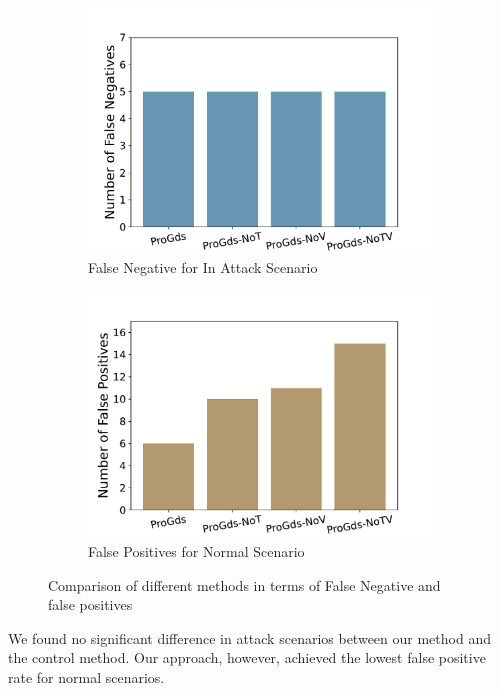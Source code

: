 \begin{figure}[h]
    \centering
    \begin{subfigure}[b]{0.23\textwidth}
        \includegraphics[width=\textwidth]{figs/FN.pdf}
        \caption{False Negative for In Attack Scenario}
        \label{fig:missed_attacks}
    \end{subfigure}
    \hfill
    \begin{subfigure}[b]{0.23\textwidth}
        \includegraphics[width=\textwidth]{figs/FP.pdf}
        \caption{False Positives for Normal Scenario}
        \label{fig:false_positives}
    \end{subfigure}
    \caption{Comparison of different methods in terms of False Negative and false positives}
    \label{fig:comparison}
\end{figure}
We found no significant difference in attack scenarios between our method and the control method. Our approach, however, achieved the lowest false positive rate for normal scenarios.


